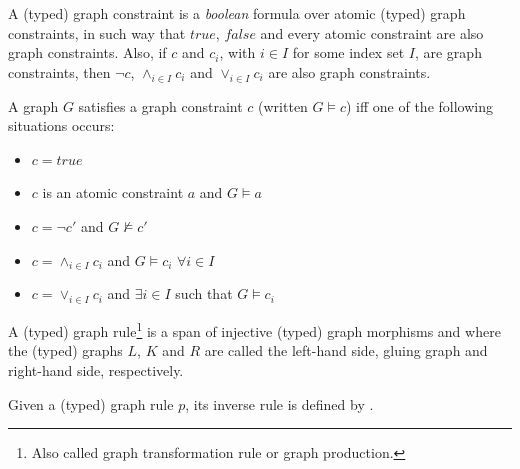 \begin{definition} A (typed) graph constraint is a \emph{boolean} formula over atomic (typed) graph constraints, in such way that $true$, $false$ and every atomic constraint are also graph constraints. Also, if $c$ and $c_i$, with $i \in I$ for some index set $I$, are graph constraints, then $\neg c$, $\land_{i \in I} c_i$ and $\lor_{i \in I} c_i$ are also graph constraints.

  A graph $G$ satisfies a graph constraint $c$ (written $G \models c$) iff one of the following situations occurs:
  \begin{itemize}
    \item $c = true$
    \item $c$ is an atomic constraint $a$ and $G \models a$
    \item $c = \neg c'$ and $G \not\models c'$
    \item $c = \land_{i \in I}c_i$ and $G \models c_i$ $\forall i \in I$ 
    \item $c = \lor_{i \in I}c_i$  and $\exists i \in I$ such that $G \models c_i$
  \end{itemize}
\end{definition}

\begin{definition}\label{def:graph-rule} A (typed) graph rule\footnote{Also called graph transformation rule or graph production.} \graphrule{} is a span of injective (typed) graph morphisms \lefthand{} and \righthand{}  where the (typed) graphs $L$, $K$ and $R$ are called the left-hand side, gluing graph and right-hand side, respectively.

  Given a (typed) graph rule $p$, its inverse rule is defined by \inversegraphrule.
\end{definition}

